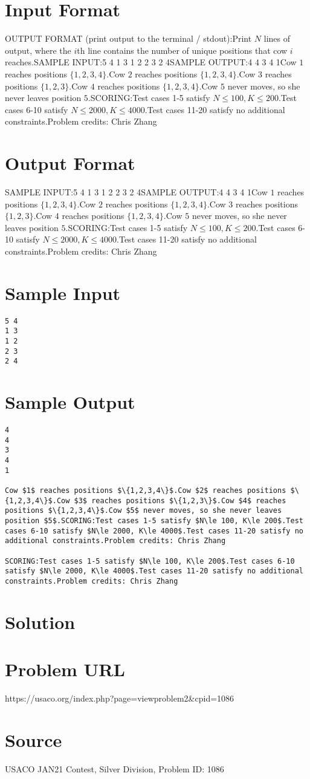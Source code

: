 \documentclass[12pt]{article}
\begin{document}
\section*{Input Format}
OUTPUT FORMAT (print output to the terminal / stdout):Print $N$ lines of output, where the $i$th line contains the number of unique
positions that cow $i$ reaches.SAMPLE INPUT:5 4
1 3
1 2
2 3
2 4SAMPLE OUTPUT:4
4
3
4
1Cow $1$ reaches positions $\{1,2,3,4\}$.Cow $2$ reaches positions $\{1,2,3,4\}$.Cow $3$ reaches positions $\{1,2,3\}$.Cow $4$ reaches positions $\{1,2,3,4\}$.Cow $5$ never moves, so she never leaves position $5$.SCORING:Test cases 1-5 satisfy $N\le 100, K\le 200$.Test cases 6-10 satisfy $N\le 2000, K\le 4000$.Test cases 11-20 satisfy no additional constraints.Problem credits: Chris Zhang

\section*{Output Format}
SAMPLE INPUT:5 4
1 3
1 2
2 3
2 4SAMPLE OUTPUT:4
4
3
4
1Cow $1$ reaches positions $\{1,2,3,4\}$.Cow $2$ reaches positions $\{1,2,3,4\}$.Cow $3$ reaches positions $\{1,2,3\}$.Cow $4$ reaches positions $\{1,2,3,4\}$.Cow $5$ never moves, so she never leaves position $5$.SCORING:Test cases 1-5 satisfy $N\le 100, K\le 200$.Test cases 6-10 satisfy $N\le 2000, K\le 4000$.Test cases 11-20 satisfy no additional constraints.Problem credits: Chris Zhang

\section*{Sample Input}
\begin{verbatim}
5 4
1 3
1 2
2 3
2 4
\end{verbatim}

\section*{Sample Output}
\begin{verbatim}
4
4
3
4
1

Cow $1$ reaches positions $\{1,2,3,4\}$.Cow $2$ reaches positions $\{1,2,3,4\}$.Cow $3$ reaches positions $\{1,2,3\}$.Cow $4$ reaches positions $\{1,2,3,4\}$.Cow $5$ never moves, so she never leaves position $5$.SCORING:Test cases 1-5 satisfy $N\le 100, K\le 200$.Test cases 6-10 satisfy $N\le 2000, K\le 4000$.Test cases 11-20 satisfy no additional constraints.Problem credits: Chris Zhang

SCORING:Test cases 1-5 satisfy $N\le 100, K\le 200$.Test cases 6-10 satisfy $N\le 2000, K\le 4000$.Test cases 11-20 satisfy no additional constraints.Problem credits: Chris Zhang
\end{verbatim}

\section*{Solution}


\section*{Problem URL}
https://usaco.org/index.php?page=viewproblem2&cpid=1086

\section*{Source}
USACO JAN21 Contest, Silver Division, Problem ID: 1086
\end{document}
